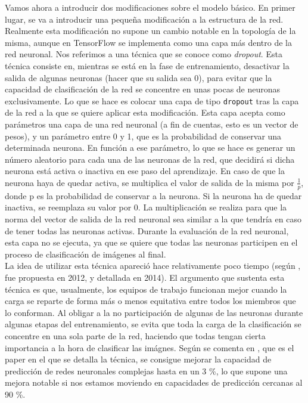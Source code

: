 \documentclass[11pt]{article}
\theoremstyle{plain}
\theoremstyle{definition}
\begin{document}
Vamos ahora a introducir dos modificaciones sobre el modelo básico. En
primer lugar, se va a introducir una pequeña modificación a la
estructura de la red. Realmente esta modificación no supone un cambio
notable en la topología de la misma, aunque en TensorFlow se
implementa como una capa más dentro de la red neuronal. Nos referimos
a una técnica que se conoce como \textit{dropout}. Esta técnica
consiste en, mientras se está en la fase de entrenamiento, desactivar
la salida de algunas neuronas (hacer que su salida sea 0), para evitar
que la capacidad de clasificación de la red se concentre en unas pocas
de neuronas exclusivamente. Lo que se hace es colocar una capa de tipo
\texttt{dropout} tras la capa de la red a la que se quiere aplicar
esta modificación. Esta capa acepta como parámetros una capa de una
red neuronal (a fin de cuentas, esto es un vector de pesos), y un
parámetro entre 0 y 1, que es la probabilidad de conservar una
determinada neurona. En función a ese parámetro, lo que se hace es
generar un número aleatorio para cada una de las neuronas de la red,
que decidirá si dicha neurona está activa o inactiva en ese paso del
aprendizaje. En caso de que la neurona haya de quedar activa, se
multiplica el valor de salida de la misma por $\frac{1}{p}$, donde p
es la probabilidad de conservar a la neurona. Si la neurona ha de
quedar inactiva, se reemplaza su valor por 0. La multiplicación se
realiza para que la norma del vector de salida de la red neuronal sea
similar a la que tendría en caso de tener todas las neuronas
activas. Durante la evaluación de la red neuronal, esta capa no se
ejecuta, ya que se quiere que todas las neuronas participen
en el proceso de clasificación de imágenes al final.\\

La idea de utilizar esta técnica apareció hace relativamente poco
tiempo (según \cite{book-tf}, fue propuesta en 2012, y detallada en
2014). El argumento que sustenta esta técnica es que, usualmente, los
equipos de trabajo funcionan mejor cuando la carga se reparte de forma
más o menos equitativa entre todos los miembros que lo conforman. Al
obligar a la no participación de algunas de las neuronas durante
algunas etapas del entrenamiento, se evita que toda la carga de la
clasificación se concentre en una sola parte de la red, haciendo que
todas tengan cierta importancia a la hora de clasificar las imágnes.
Según se comenta en \cite{Srivastava:2014:DSW:2627435.2670313}, que es
el paper en el que se detalla la técnica, se consigue mejorar la
capacidad de predicción de redes neuronales complejas hasta en un 3
\%, lo que supone una mejora notable si nos estamos moviendo en
capacidades de predicción cercanas al 90 \%.\\
\end{document}

